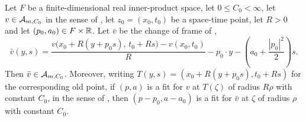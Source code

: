 \begin{lemma}
Let $F$ be a finite-dimensional real inner-product space, let $0\le C_0<\infty$,
let $v\in\mathcal{A}_{m,C_0}$ in the sense of , let
$z_0=(x_0,t_0)$ be a space-time point, let $R>0$ and let
$(p_0,a_0)\in F\times\mathbb{R}$. Let $\bar v$ be the change of frame of
,
\[
  \bar v(y,s)=
  \frac{v\bigl(x_0+R(y+p_0s),\,t_0+Rs\bigr)-v(x_0,t_0)}{R}
       -p_0\cdot y-\left(a_0+\frac{|p_0|^2}{2}\right)s .
\]
Then $\bar v\in\mathcal{A}_{m,C_0}$. Moreover, writing $T(y,s)=(x_0+R(y+p_0s),
t_0+Rs)$ for the corresponding old point, if $(p,a)$ is a fit for $v$ at
$T(\zeta)$ of radius $R\rho$ with constant $C_0$, in the sense of
, then $(p-p_0,a-a_0)$ is a fit for $\bar v$ at $\zeta$ of radius
$\rho$ with constant $C_0$.
\end{lemma}
